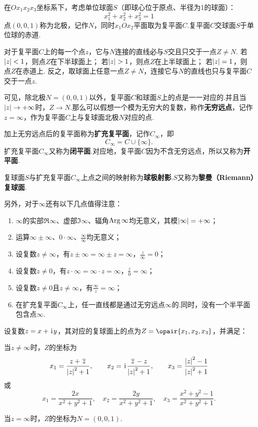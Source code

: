 \begin{definition}[复数在复球面上的几何表示]
在\(Ox_1x_2x_3\)坐标系下，考虑单位球面\(S\)（即球心位于原点、半径为1的球面）：\[
x_1^2+x_2^2+x_3^2=1
\]点\((0,0,1)\)称为北极，记作\(N\)，同时\(x_1Ox_2\)平面取为复平面\(C\).复平面\(C\)交球面\(S\)于单位球的赤道.

对于复平面\(C\)上的每一个点\(z\)，它与\(N\)连接的直线必与\(S\)交且只交于一点\(Z \neq N\).
若\(\abs{z} < 1\)，则点\(Z\)在下半球面上；
若\(\abs{z} > 1\)，则点\(Z\)在上半球面上；
若\(\abs{z} = 1\)，则点\(Z\)在赤道上.
反之，取球面上任意一点\(Z \neq N\)，连接它与\(N\)的直线也只与复平面\(C\)交于一点\(z\).

可见，除北极\(N=(0,0,1)\)以外，复平面\(C\)和球面\(S\)上的点是一一对应的.并且当\(\abs{z} \to +\infty\)时，\(Z \to N\).那么可以假想一个模为无穷大的复数，称作\textbf{无穷远点}，记作\(z = \infty\)，作为复平面\(C\)上与复球面北极\(N\)对应的点.

加上无穷远点后的复平面称为\textbf{扩充复平面}，记作\(C_{\infty}\)，即\[
C_{\infty} = C \cup \{\infty\}.
\]
扩充复平面\(C_{\infty}\)又称为\textbf{闭平面}.对应地，复平面\(C\)因为不含无穷远点，所以又称为\textbf{开平面}.

复球面\(S\)与扩充复平面\(C_{\infty}\)上点之间的映射称为\textbf{球极射影}.\(S\)又称为\textbf{黎曼（Riemann）复球面}.

另外，对于\(\infty\)还有以下几点值得注意：
\begin{enumerate}
\item \(\infty\)的实部\(\Re\infty\)、虚部\(\Im\infty\)、辐角\(\operatorname{Arg}\infty\)均无意义，其模\(\abs{\infty}=+\infty\)；
\item 运算\(\infty \pm \infty\)、\(0 \cdot \infty\)、\(\frac{\infty}{\infty}\)均无意义；
\item 设复数\(z \neq \infty\)，有\(z \pm \infty = \infty \pm z = \infty\)，\(\frac{z}{\infty} = 0\)；
\item 设复数\(z \neq 0\)，有\(z \cdot \infty = \infty \cdot z = \infty\)，\(\frac{z}{0} = \infty\)；
\item 设复数\(z \neq 0\)且\(z \neq \infty\)，有\(\frac{\infty}{z} = \infty\)；
\item 在扩充复平面\(C_{\infty}\)上，任一直线都是通过无穷远点\(\infty\)的.同时，没有一个半平面包含点\(\infty\).
\end{enumerate}
\end{definition}

\begin{theorem}
设复数\(z=x+\kern1pt\mathrm{i}\kern1pt y\)，其对应的复球面上的点为\(Z=\opair{x_1,x_2,x_3}\)，并满足：

当\(z \neq \infty\)时，\(Z\)的坐标为\[
x_1 = \frac{z + \kern1pt\overline{z}\kern1pt}{\abs{z}^2 + 1}, \qquad
x_2 = \kern1pt\mathrm{i}\kern1pt\frac{\kern1pt\overline{z}\kern1pt - z}{\abs{z}^2 + 1}, \qquad
x_3 = \frac{\abs{z}^2 - 1}{\abs{z}^2 + 1}
\]或\[
x_1 = \frac{2x}{x^2+y^2+1}, \quad
x_2 = \frac{2y}{x^2+y^2+1}, \quad
x_3 = \frac{x^2+y^2-1}{x^2+y^2+1}.
\]

当\(z = \infty\)时，\(Z\)的坐标为\(N = (0,0,1)\).
\end{theorem}

